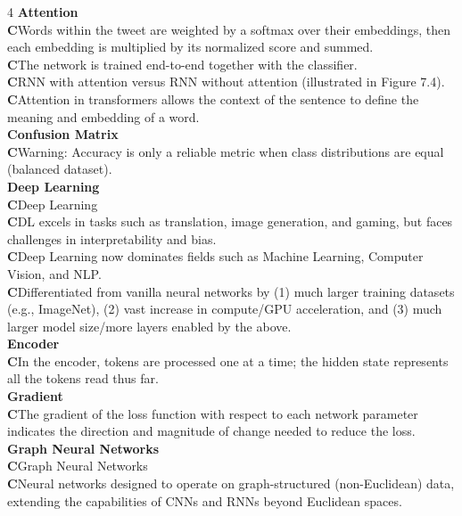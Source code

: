 \documentclass[8pt]{extarticle}
\newcommand{\ctag}{\textcolor{conceptcolor}{\tiny\textbf{C}}\;}
\begin{document}
\begin{multicols}{4}
\vspace{2pt}\textbf{Attention}\\
\ctag Words within the tweet are weighted by a softmax over their embeddings, then each embedding is multiplied by its normalized score and summed.\\
\ctag The network is trained end-to-end together with the classifier.\\
\ctag RNN with attention versus RNN without attention (illustrated in Figure 7.4).\\
\ctag Attention in transformers allows the context of the sentence to define the meaning and embedding of a word.\\

\vspace{2pt}\textbf{Confusion Matrix}\\
\ctag Warning: Accuracy is only a reliable metric when class distributions are equal (balanced dataset).\\
\vspace{2pt}\textbf{Deep Learning}\\
\ctag Deep Learning\\
\ctag DL excels in tasks such as translation, image generation, and gaming, but faces challenges in interpretability and bias.\\
\ctag Deep Learning now dominates fields such as Machine Learning, Computer Vision, and NLP.\\
\ctag Differentiated from vanilla neural networks by (1) much larger training datasets (e.g., ImageNet), (2) vast increase in compute/GPU acceleration, and (3) much larger model size/more layers enabled by the above.\\
\vspace{2pt}\textbf{Encoder}\\
\ctag In the encoder, tokens are processed one at a time; the hidden state represents all the tokens read thus far.\\
\vspace{2pt}\textbf{Gradient}\\
\ctag The gradient of the loss function with respect to each network parameter indicates the direction and magnitude of change needed to reduce the loss.\\
\vspace{2pt}\textbf{Graph Neural Networks}\\
\ctag Graph Neural Networks\\
\ctag Neural networks designed to operate on graph-structured (non-Euclidean) data, extending the capabilities of CNNs and RNNs beyond Euclidean spaces.\\

\end{multicols}
\end{document}
